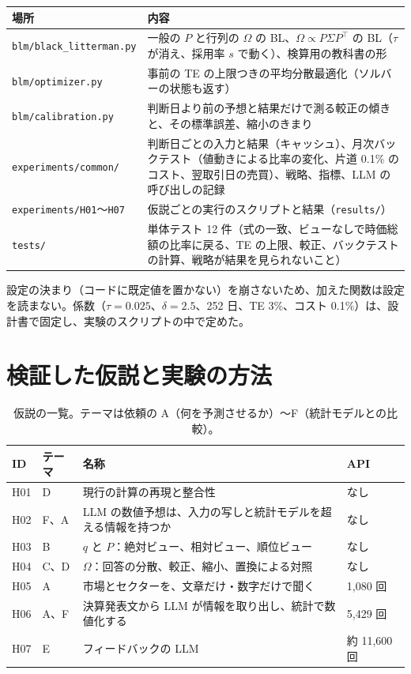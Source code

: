 \documentclass[xelatex,ja=standard,jafont=haranoaji,a4paper,10pt,openany]{bxjsreport}
\newcommand{\code}[1]{\texttt{#1}}
\newcommand{\T}{^{\top}}
\begin{document}
\begin{longtable}{p{4.4cm}p{10.5cm}}
\toprule
\textbf{場所} & \textbf{内容} \\
\midrule
\endfirsthead
\bottomrule
\endfoot
\code{blm/black\_litterman.py} & 一般の $P$ と行列の $\Omega$ の BL、$\Omega\propto P\Sigma P\T$ の BL（$\tau$ が消え、採用率 $s$ で動く）、検算用の教科書の形 \\
\code{blm/optimizer.py} & 事前の TE の上限つきの平均分散最適化（ソルバーの状態も返す） \\
\code{blm/calibration.py} & 判断日より前の予想と結果だけで測る較正の傾きと、その標準誤差、縮小のきまり \\
\code{experiments/common/} & 判断日ごとの入力と結果（キャッシュ）、月次バックテスト（値動きによる比率の変化、片道 0.1\% のコスト、翌取引日の売買）、戦略、指標、LLM の呼び出しの記録 \\
\code{experiments/H01}〜\code{H07} & 仮説ごとの実行のスクリプトと結果（\code{results/}） \\
\code{tests/} & 単体テスト 12 件（式の一致、ビューなしで時価総額の比率に戻る、TE の上限、較正、バックテストの計算、戦略が結果を見られないこと） \\
\end{longtable}

設定の決まり（コードに既定値を置かない）を崩さないため、加えた関数は設定を読まない。係数（$\tau=0.025$、$\delta=2.5$、252 日、TE 3\%、コスト 0.1\%）は、設計書で固定し、実験のスクリプトの中で定めた。

\chapter{検証した仮説と実験の方法}\label{ch:method}

\begin{table}[htbp]
\centering
\caption{仮説の一覧。テーマは依頼の A（何を予測させるか）〜F（統計モデルとの比較）。}
\small
\begin{tabular}{p{0.9cm}p{1.1cm}p{9.0cm}p{2.6cm}}
\toprule
ID & テーマ & 名称 & API \\
\midrule
H01 & D & 現行の計算の再現と整合性 & なし \\
H02 & F、A & LLM の数値予想は、入力の写しと統計モデルを超える情報を持つか & なし \\
H03 & B & $q$ と $P$：絶対ビュー、相対ビュー、順位ビュー & なし \\
H04 & C、D & $\Omega$：回答の分散、較正、縮小、置換による対照 & なし \\
H05 & A & 市場とセクターを、文章だけ・数字だけで聞く & 1,080 回 \\
H06 & A、F & 決算発表文から LLM が情報を取り出し、統計で数値化する & 5,429 回 \\
H07 & E & フィードバックの LLM & 約 11,600 回 \\
\bottomrule
\end{tabular}
\end{table}
\end{document}
